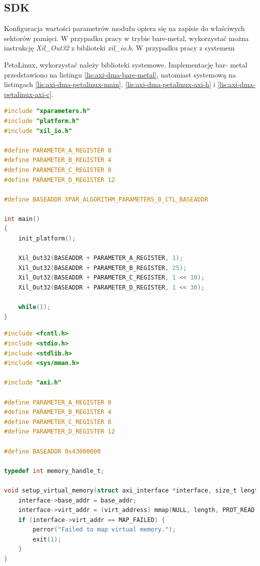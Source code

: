 \subsection{SDK}
\label{sec:vivado-axi-dma-sdk}
Konfiguracja wartości parametrów modułu opiera się na zapisie do właściwych sektorów pamięci. W przypadku pracy w trybie bare-metal, wykorzystać można instrukcję \emph{Xil\_Out32} z biblioteki \emph{xil\_io.h}. W przypadku pracy z systemem {PetaLinux, wykorzystać należy biblioteki systemowe. Implementację bar- metal przedstawiono na listingu \ref{lis:axi-dma-bare-metal}, natomiast systemową na listingach \ref{lis:axi-dma-petalinux-main}, \ref{lis:axi-dma-petalinux-axi-h} i \ref{lis:axi-dma-petalinux-axi-c}.

\begin{lstlisting}[breaklines, language=C, label=lis:axi-dma-bare-metal, caption=Obsługa modułu w trybie bare-metal.]
#include "xparameters.h"
#include "platform.h"
#include "xil_io.h"

#define PARAMETER_A_REGISTER 0
#define PARAMETER_B_REGISTER 4
#define PARAMETER_C_REGISTER 8
#define PARAMETER_D_REGISTER 12

#define BASEADDR XPAR_ALGORITHM_PARAMETERS_0_CTL_BASEADDR

int main()
{
	init_platform();
	
	Xil_Out32(BASEADDR + PARAMETER_A_REGISTER, 1);
	Xil_Out32(BASEADDR + PARAMETER_B_REGISTER, 25);
	Xil_Out32(BASEADDR + PARAMETER_C_REGISTER, 1 << 10);
	Xil_Out32(BASEADDR + PARAMETER_D_REGISTER, 1 << 30);
	
	while(1);
}
\end{lstlisting}


\begin{lstlisting}[breaklines, language=C, label=lis:axi-dma-petalinux-main, caption=Obsługa modułu w trybie systemowym - \texttt{main.c}.]
#include <fcntl.h>
#include <stdio.h>
#include <stdlib.h>
#include <sys/mman.h>

#include "axi.h"

#define PARAMETER_A_REGISTER 0
#define PARAMETER_B_REGISTER 4
#define PARAMETER_C_REGISTER 8
#define PARAMETER_D_REGISTER 12

#define BASEADDR 0x43000000

typedef int memory_handle_t;

void setup_virtual_memory(struct axi_interface *interface, size_t length, memory_handle_t memory_handle, off_t base_addr) {
	interface->base_addr = base_addr;
	interface->virt_addr = (virt_address) mmap(NULL, length, PROT_READ | PROT_WRITE, MAP_SHARED, memory_handle, base_addr);
	if (interface->virt_addr == MAP_FAILED) {
		perror("Failed to map virtual memory.");
		exit(1);
	}
}


\end{lstlisting}}
